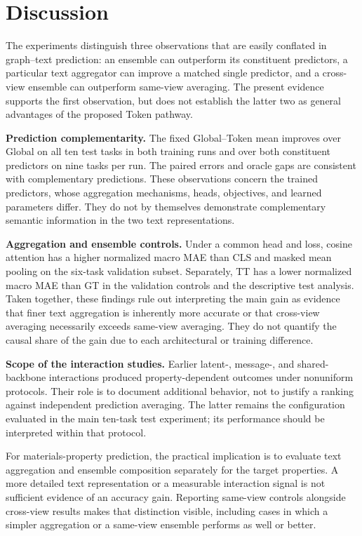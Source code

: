 \documentclass[a4paper,fleqn]{cas-sc}
\begin{document}
\section{Discussion}
The experiments distinguish three observations that are easily conflated in graph--text prediction: an ensemble can outperform its constituent predictors, a particular text aggregator can improve a matched single predictor, and a cross-view ensemble can outperform same-view averaging. The present evidence supports the first observation, but does not establish the latter two as general advantages of the proposed Token pathway.

\textbf{Prediction complementarity.} The fixed Global--Token mean improves over Global on all ten test tasks in both training runs and over both constituent predictors on nine tasks per run. The paired errors and oracle gaps are consistent with complementary predictions. These observations concern the trained predictors, whose aggregation mechanisms, heads, objectives, and learned parameters differ. They do not by themselves demonstrate complementary semantic information in the two text representations.

\textbf{Aggregation and ensemble controls.} Under a common head and loss, cosine attention has a higher normalized macro MAE than CLS and masked mean pooling on the six-task validation subset. Separately, TT has a lower normalized macro MAE than GT in the validation controls and the descriptive test analysis. Taken together, these findings rule out interpreting the main gain as evidence that finer text aggregation is inherently more accurate or that cross-view averaging necessarily exceeds same-view averaging. They do not quantify the causal share of the gain due to each architectural or training difference.

\textbf{Scope of the interaction studies.} Earlier latent-, message-, and shared-backbone interactions produced property-dependent outcomes under nonuniform protocols. Their role is to document additional behavior, not to justify a ranking against independent prediction averaging. The latter remains the configuration evaluated in the main ten-task test experiment; its performance should be interpreted within that protocol.

For materials-property prediction, the practical implication is to evaluate text aggregation and ensemble composition separately for the target properties. A more detailed text representation or a measurable interaction signal is not sufficient evidence of an accuracy gain. Reporting same-view controls alongside cross-view results makes that distinction visible, including cases in which a simpler aggregation or a same-view ensemble performs as well or better.
\end{document}
